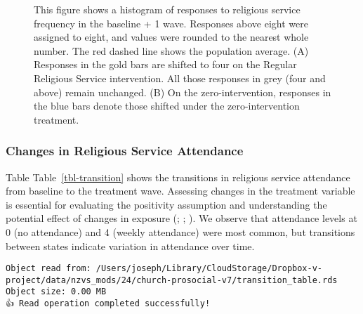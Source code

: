 \documentclass[
  single column]{article}
\begin{document}
\begin{figure}


\caption{\label{fig-hist}This figure shows a histogram of responses to
religious service frequency in the baseline + 1 wave. Responses above
eight were assigned to eight, and values were rounded to the nearest
whole number. The red dashed line shows the population average. (A)
Responses in the gold bars are shifted to four on the Regular Religious
Service intervention. All those responses in grey (four and above)
remain unchanged. (B) On the zero-intervention, responses in the blue
bars denote those shifted under the zero-intervention treatment.}

\end{figure}%

\newpage{}

\subsubsection{Changes in Religious Service
Attendance}\label{changes-in-religious-service-attendance}

Table Table~\ref{tbl-transition} shows the transitions in religious
service attendance from baseline to the treatment wave. Assessing
changes in the treatment variable is essential for evaluating the
positivity assumption and understanding the potential effect of changes
in exposure (;
;
). We
observe that attendance levels at 0 (no attendance) and 4 (weekly
attendance) were most common, but transitions between states indicate
variation in attendance over time.

\begin{verbatim}
Object read from: /Users/joseph/Library/CloudStorage/Dropbox-v-project/data/nzvs_mods/24/church-prosocial-v7/transition_table.rds
Object size: 0.00 MB
👍 Read operation completed successfully!
\end{verbatim}
\end{document}
